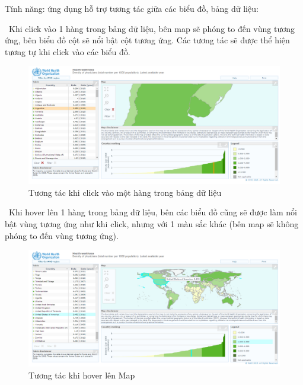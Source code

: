 \documentclass[12pt,a4paper,oneside]{article}
\begin{document}
Tính năng: ứng dụng hỗ trợ tương tác giữa các biểu đồ, bảng dữ liệu:

\indent \indent \textbullet \ Khi click vào 1 hàng trong bảng dữ liệu, bên map sẽ phóng to đến vùng tương ứng, bên biểu đồ cột sẽ nổi bật cột tương ứng. Các tương tác sẽ được thể hiện tương tự khi click vào các biểu đồ.
\begin{center}
    \begin{figure}[htp]
    \begin{center}
     \includegraphics[scale=.4]{image/clickatlas}
    \end{center}
    \caption{Tương tác khi click vào một hàng trong bảng dữ liệu}
    \label{refhinh3}
    \end{figure}
\end{center}
\indent \indent \textbullet \ Khi hover lên 1 hàng trong bảng dữ liệu, bên các biểu đồ cũng sẽ được làm nổi bật vùng tương ứng như khi click, nhưng với 1 màu sắc khác (bên map sẽ không phóng to đến vùng tương ứng).
\begin{center}
    \begin{figure}[htp]
    \begin{center}
     \includegraphics[scale=.4]{image/hoveratlas}
    \end{center}
    \caption{Tương tác khi hover lên Map}
    \label{refhinh4}
    \end{figure}
\end{center}
\end{document}
